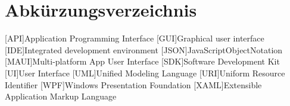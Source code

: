 \chapter{Abkürzungsverzeichnis}
\begin{acronym}[MAUI]
[API]{Application Programming Interface}
[GUI]{Graphical user interface}
[IDE]{Integrated development environment}
[JSON]{JavaScriptObjectNotation}
[MAUI]{Multi-platform App User Interface}
[SDK]{Software Development Kit}
[UI]{User Interface}
[UML]{Unified Modeling Language}
[URI]{Uniform Resource Identifier}
[WPF]{Windows Presentation Foundation}
[XAML]{Extensible Application Markup Language}

\end{acronym}